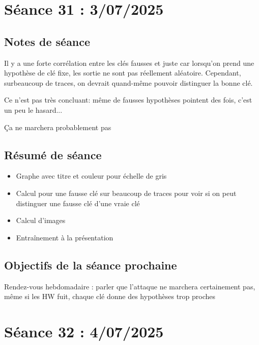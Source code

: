 \documentclass[12pt]{article}
\newcommand{\cmark}{\ding{51}}%
\newcommand{\done}{\rlap{$\square$}{\raisebox{2pt}{\large\hspace{1pt}\cmark}}%
	\hspace{-2.5pt}}
\begin{document}
	
	\section{Séance 31 : 3/07/2025}
	\subsection{Notes de séance}
	Il y a une forte corrélation entre les clés fausses et juste car lorsqu'on prend une hypothèse de clé fixe, les sortie ne sont pas réellement aléatoire. Cependant, surbeaucoup de traces, on devrait quand-même pouvoir distinguer la bonne clé.
	
	\noindent Ce n'est pas très concluant: même de fausses hypothèses pointent des fois, c'est un peu le hasard...
	
	\noindent \c{C}a ne marchera probablement pas 
	
	\subsection{Résumé de séance}
	\begin{itemize}
		\item Graphe avec titre et couleur pour échelle de gris
		\item Calcul pour une fausse clé sur beaucoup de traces pour voir si on peut distinguer une fausse clé d'une vraie clé
		\item Calcul d'images
		\item Entraînement à la présentation
	\end{itemize}
	
	\subsection{Objectifs de la séance prochaine}
	\begin{todolist}
		\item[\done] Rendez-vous hebdomadaire : parler que l'attaque ne marchera certainement pas, même si les HW fuit, chaque clé donne des hypothèses trop proches
	\end{todolist}
	
	
	\section{Séance 32 : 4/07/2025}
\end{document}

